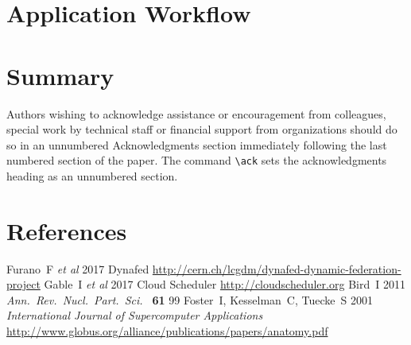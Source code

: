 \documentclass[a4paper]{jpconf}
\begin{document}
\section{Application Workflow}


\section{Summary}


\ack
Authors wishing to acknowledge assistance or encouragement from
colleagues, special work by technical staff or financial support from
organizations should do so in an unnumbered Acknowledgments section
immediately following the last numbered section of the paper. The
command \verb"\ack" sets the acknowledgments heading as an unnumbered
section.


\section*{References}
\begin{thebibliography}{9}
  Furano~F {\it et al}
  2017
  Dynafed
  \url{http://cern.ch/lcgdm/dynafed-dynamic-federation-project}
  Gable~I {\it et al}
  2017
  Cloud Scheduler
  \url{http://cloudscheduler.org}
  Bird~I
  2011
  {\it Ann.\ Rev.\ Nucl.\ Part.\ Sci.\ } {\bf 61} 99
  Foster~I, Kesselman~C, Tuecke~S
  2001
  {\it International Journal of Supercomputer Applications}
  \url{http://www.globus.org/alliance/publications/papers/anatomy.pdf}


\end{thebibliography}
\end{document}
